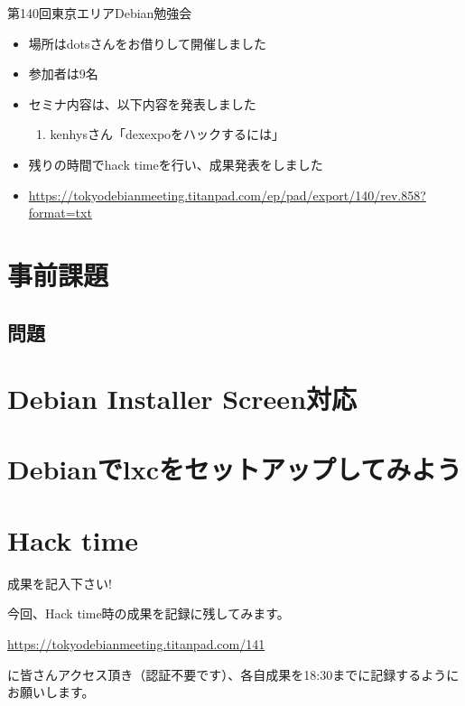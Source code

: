 \begin{frame}{第140回東京エリアDebian勉強会 }

\begin{itemize}
\item 場所はdotsさんをお借りして開催しました
\item 参加者は9名
\item セミナ内容は、以下内容を発表しました
  \begin{enumerate}
  \item kenhysさん「dexexpoをハックするには」
  \end{enumerate}
\item 残りの時間でhack timeを行い、成果発表をしました
\item \url{https://tokyodebianmeeting.titanpad.com/ep/pad/export/140/rev.858?format=txt}
\end{itemize} 
\end{frame}

\section{事前課題}
{\footnotesize
 
}

\subsection{問題}



\section{Debian Installer Screen対応}

\section{Debianでlxcをセットアップしてみよう}

\section{Hack time}

\begin{frame}{成果を記入下さい!}

  今回、Hack time時の成果を記録に残してみます。

\url{https://tokyodebianmeeting.titanpad.com/141}

に皆さんアクセス頂き（認証不要です）、各自成果を18:30までに記録するようにお願いします。

\end{frame}
  
